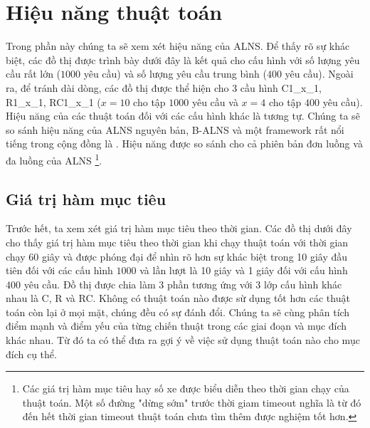 \section{Hiệu năng thuật toán}
\label{sec:performance}
Trong phần này chúng ta sẽ xem xét hiệu năng của ALNS. Để thấy rõ sự khác biệt, các đồ thị được trình bày dưới đây là kết quả cho cấu hình với số lượng yêu cầu rất lớn ($1000$ yêu cầu) và số lượng yêu cầu trung bình ($400$ yêu cầu). Ngoài ra, để tránh dài dòng, các đồ thị được thể hiện cho 3 cầu hình C1\_x\_1, R1\_x\_1, RC1\_x\_1 ($x = 10$ cho tập $1000$ yêu cầu và $x=4$ cho tập $400$ yêu cầu). Hiệu năng của các thuật toán đối với các cấu hình khác là tương tự. Chúng ta sẽ so sánh hiệu năng của ALNS nguyên bản, B-ALNS và một framework rất nổi tiếng trong cộng đồng là . Hiệu năng được so sánh cho cả phiên bản đơn luồng và đa luồng của ALNS \footnote[1]{Các giá trị hàm mục tiêu hay số xe được biểu diễn theo thời gian chạy của thuật toán. Một số đường "dừng sớm" trước thời giam timeout nghĩa là từ đó đến hết thời gian timeout thuật toán chưa tìm thêm được nghiệm tốt hơn.}.

\subsection{Giá trị hàm mục tiêu}

Trước hết, ta xem xét giá trị hàm mục tiêu theo thời gian. Các đồ thị dưới đây cho thấy giá trị hàm mục tiêu theo thời gian khi chạy thuật toán với thời gian chạy 60 giây và được phóng đại để nhìn rõ hơn sự khác biệt trong 10 giây đầu tiên đối với các cấu hình $1000$ và lần lượt là 10 giây và 1 giây đối với cấu hình $400$ yêu cầu. Đồ thị được chia làm 3 phần tương ứng với 3 lớp cấu hình khác nhau là C, R và RC. Không có thuật toán nào được sừ dụng tốt hơn các thuật toán còn lại ở mọi mặt, chúng đều có sự đánh đổi. Chúng ta sẽ cùng phân tích điểm mạnh và điểm yếu của từng chiến thuật trong các giai đoạn và mục đích khác nhau. Từ đó ta có thể đưa ra gợi ý về việc sử dụng thuật toán nào cho mục đích cụ thể.

